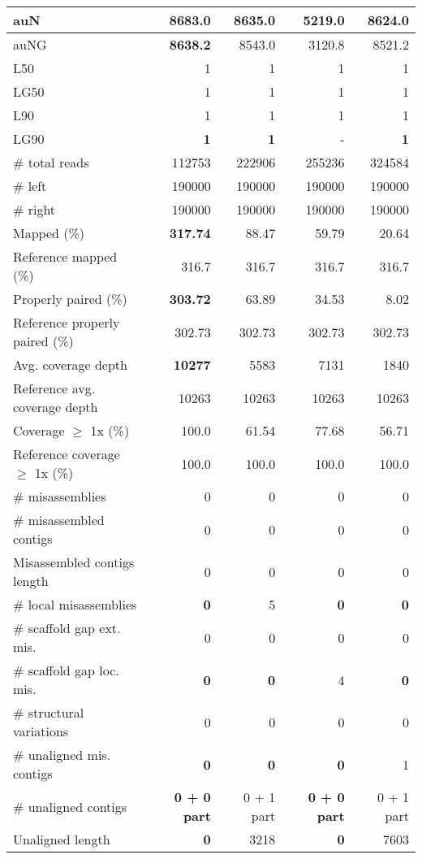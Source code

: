 \documentclass[12pt,a4paper]{article}
\begin{document}
\begin{table}[ht]
\begin{center}
\begin{tabular}{|l*{4}{|r}|}
auN & {\bf 8683.0} & 8635.0 & 5219.0 & 8624.0 \\ \hline
auNG & {\bf 8638.2} & 8543.0 & 3120.8 & 8521.2 \\ \hline
L50 & 1 & 1 & 1 & 1 \\ \hline
LG50 & 1 & 1 & 1 & 1 \\ \hline
L90 & 1 & 1 & 1 & 1 \\ \hline
LG90 & {\bf 1} & {\bf 1} & - & {\bf 1} \\ \hline
\# total reads & 112753 & 222906 & 255236 & 324584 \\ \hline
\# left & 190000 & 190000 & 190000 & 190000 \\ \hline
\# right & 190000 & 190000 & 190000 & 190000 \\ \hline
Mapped (\%) & {\bf 317.74} & 88.47 & 59.79 & 20.64 \\ \hline
Reference mapped (\%) & 316.7 & 316.7 & 316.7 & 316.7 \\ \hline
Properly paired (\%) & {\bf 303.72} & 63.89 & 34.53 & 8.02 \\ \hline
Reference properly paired (\%) & 302.73 & 302.73 & 302.73 & 302.73 \\ \hline
Avg. coverage depth & {\bf 10277} & 5583 & 7131 & 1840 \\ \hline
Reference avg. coverage depth & 10263 & 10263 & 10263 & 10263 \\ \hline
Coverage $\geq$ 1x (\%) & 100.0 & 61.54 & 77.68 & 56.71 \\ \hline
Reference coverage $\geq$ 1x (\%) & 100.0 & 100.0 & 100.0 & 100.0 \\ \hline
\# misassemblies & 0 & 0 & 0 & 0 \\ \hline
\# misassembled contigs & 0 & 0 & 0 & 0 \\ \hline
Misassembled contigs length & 0 & 0 & 0 & 0 \\ \hline
\# local misassemblies & {\bf 0} & 5 & {\bf 0} & {\bf 0} \\ \hline
\# scaffold gap ext. mis. & 0 & 0 & 0 & 0 \\ \hline
\# scaffold gap loc. mis. & {\bf 0} & {\bf 0} & 4 & {\bf 0} \\ \hline
\# structural variations & 0 & 0 & 0 & 0 \\ \hline
\# unaligned mis. contigs & {\bf 0} & {\bf 0} & {\bf 0} & 1 \\ \hline
\# unaligned contigs & {\bf 0 + 0 part} & 0 + 1 part & {\bf 0 + 0 part} & 0 + 1 part \\ \hline
Unaligned length & {\bf 0} & 3218 & {\bf 0} & 7603 \\ \hline

\end{tabular}
\end{center}
\end{table}
\end{document}
